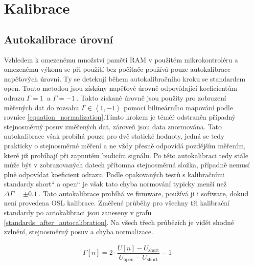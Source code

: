 \chapter{Kalibrace}

\section{Autokalibrace úrovní}
Vzhledem k omezenému množství paměti RAM v použitém mikrokontroléru a omezenému výkonu se při použití bez počítače používá pouze autokalibrace napěťových úrovní. Ty se detekují během autokalibračního kroku se standardem open. Touto metodou jsou získány napěťové úrovně odpovídající koeficientům odrazu $\Gamma=\SI{1}{}$ a $\Gamma=\SI{-1}{}$. Takto získané úrovně jsou použity pro zobrazení měřených dat do rozsahu $\Gamma\in\left\langle 1, -1 \right\rangle $ pomocí bilineárního mapování podle rovnice \ref{equation_normalization}.Tímto krokem je téměř odstraněn případný stejnosměrný posuv změřených dat, zároveň jsou data znormována. Tato autokalibrace však probíhá pouze pro dvě statické hodnoty, jedná se tedy prakticky o stejnosměrné měření a ne vždy přesně odpovídá pozdějším měřením, které již probíhají při zapnutém budicím signálu. Po této autokalibraci tedy stále může být v zobrazovaných datech přítomna stejnosměrná složka, případně nemusí plně odpovídat koeficient odrazu. Podle opakovaných testů s kalibračními standardy \quotedblbase short\textquotedblleft{} a \quotedblbase open\textquotedblleft{} je však tato chyba normování typicky menší než $\Delta\Gamma=\pm\SI{0.1}{}$. Tato autokalibrace probíhá ve firmware, používá ji i software, dokud není provedena OSL kalibrace. Změřené průběhy pro všechny tři kalibrační standardy po autokalibraci jsou zaneseny v grafu \ref{standards_after_autocalibration}. Na všech třech průbězích je vidět shodné zvlnění, stejnosměrný posuv a chyba normalizace.

\begin{equation}
\begin{gathered}
	\Gamma[n]=2\cdot\dfrac{U[n]-U_\mathrm{short}}{U_\mathrm{open}-U_\mathrm{short}} -1
\end{gathered}
\label{equation_normalization}
\end{equation}

